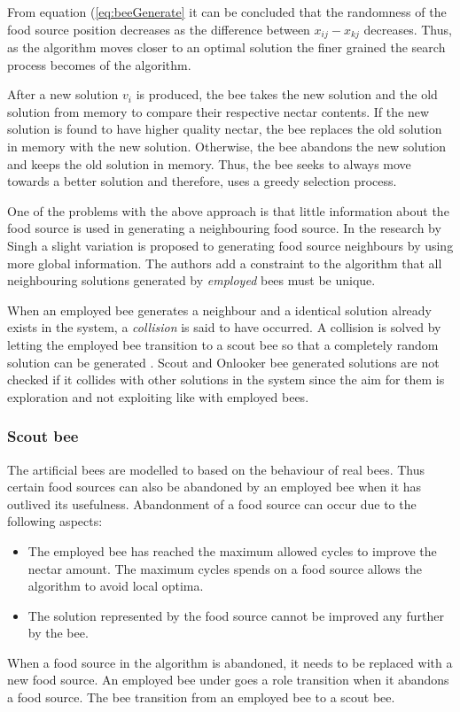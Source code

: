 From equation (\ref{eq:beeGenerate} it can be concluded that the randomness of the food source position decreases as the difference between $x_{ij} - x_{kj}$ decreases. Thus, as the algorithm moves closer to an optimal solution the finer grained the search process becomes of the algorithm.

After a new solution $v_i$ is produced, the bee takes the new solution and the old solution from memory to compare their respective nectar contents. If the new solution is found to have higher quality nectar, the bee replaces the old solution in memory with the new solution. Otherwise, the bee abandons the new solution and keeps the old solution in memory. Thus, the bee seeks to always move towards a better solution and therefore, uses a greedy selection process.

One of the problems with the above approach is that little information about the food source is used in generating a neighbouring food source. In the research by Singh \cite{ABCLeafConstrained} a slight variation is proposed to generating food source neighbours by using more global information. The authors add a constraint to the algorithm that all neighbouring solutions generated by \emph{employed} bees must be unique. 

When an employed bee generates a neighbour and a identical solution already exists in the system, a \emph{collision} is said to have occurred. A collision is solved by letting the employed bee transition to a scout bee so that a completely random solution can be generated \cite{ABCLeafConstrained}. Scout and Onlooker bee generated solutions are not checked if it collides with other solutions in the system since the aim for them is exploration and not exploiting like with employed bees. 
\subsubsection{Scout bee}
The artificial bees are modelled to based on the behaviour of real bees. Thus certain food sources can also be abandoned by an employed bee when it has outlived its usefulness. Abandonment of a food source can occur due to the following aspects:
\begin{itemize}
\item The employed bee has reached the maximum allowed cycles to improve the nectar amount. The maximum cycles spends on a food source allows the algorithm to avoid local optima.
\item The solution represented by the food source cannot be improved any further by the bee.
\end{itemize}
When a food source in the algorithm is abandoned, it needs to be replaced with a new food source. An employed bee under goes a role transition when it abandons a food source. The bee transition from an employed bee to a scout bee. 

